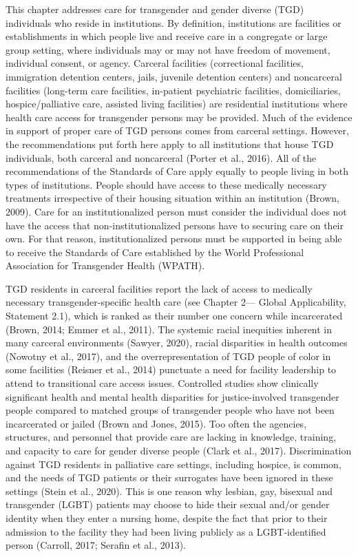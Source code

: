 \documentclass[
]{book}
\begin{document}
This chapter addresses care for transgender and
gender diverse (TGD) individuals who reside in
institutions. By definition, institutions are facilities or establishments in which people live and
receive care in a congregate or large group setting, where individuals may or may not have
freedom of movement, individual consent, or
agency. Carceral facilities (correctional facilities,
immigration detention centers, jails, juvenile
detention centers) and noncarceral facilities
(long-term care facilities, in-patient psychiatric
facilities, domiciliaries, hospice/palliative care,
assisted living facilities) are residential institutions
where health care access for transgender persons
may be provided. Much of the evidence in support of proper care of TGD persons comes from
carceral settings. However, the recommendations
put forth here apply to all institutions that house
TGD individuals, both carceral and noncarceral
(Porter et al., 2016). All of the recommendations
of the Standards of Care apply equally to people
living in both types of institutions. People should
have access to these medically necessary treatments irrespective of their housing situation
within an institution (Brown, 2009). Care for an
institutionalized person must consider the individual does not have the access that
non-institutionalized persons have to securing
care on their own. For that reason,
institutionalized persons must be supported in
being able to receive the Standards of Care established by the World Professional Association for
Transgender Health (WPATH).

TGD residents in carceral facilities report the
lack of access to medically necessary
transgender-specific health care (see Chapter 2---
Global Applicability, Statement 2.1), which is
ranked as their number one concern while incarcerated (Brown, 2014; Emmer et al., 2011). The
systemic racial inequities inherent in many
carceral environments (Sawyer, 2020), racial disparities in health outcomes (Nowotny et al.,
2017), and the overrepresentation of TGD people
of color in some facilities (Reisner et al., 2014)
punctuate a need for facility leadership to attend
to transitional care access issues. Controlled studies show clinically significant health and mental
health disparities for justice-involved transgender
people compared to matched groups of transgender people who have not been incarcerated or
jailed (Brown and Jones, 2015). Too often the
agencies, structures, and personnel that provide
care are lacking in knowledge, training, and
capacity to care for gender diverse people (Clark
et al., 2017). Discrimination against TGD residents in palliative care settings, including hospice,
is common, and the needs of TGD patients or
their surrogates have been ignored in these settings (Stein et al., 2020). This is one reason why
lesbian, gay, bisexual and transgender (LGBT)
patients may choose to hide their sexual and/or
gender identity when they enter a nursing home,
despite the fact that prior to their admission to
the facility they had been living publicly as a
LGBT-identified person (Carroll, 2017; Serafin
et al., 2013).
\end{document}
